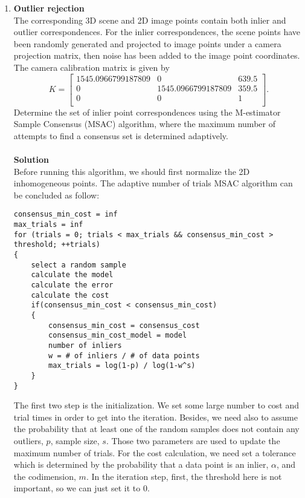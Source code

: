 \documentclass{../../assignment}
\date{\today}
\begin{document}
\begin{problemlist}


\begin{enumerate}
\item \textbf{Outlier rejection}\\
The corresponding 3D scene and 2D image points contain both inlier and outlier correspondences. For the inlier correspondences, the scene points have been randomly generated and projected to image points under a camera projection matrix, then noise has been added to the image point coordinates. The camera calibration matrix is given by
\[K = 
\begin{bmatrix}
1545.0966799187809 & 0 & 639.5\\
0 & 1545.0966799187809 & 359.5\\
0 & 0 & 1\\
\end{bmatrix}.
\]
Determine the set of inlier point correspondences using the M-estimator Sample Consensus (MSAC) algorithm, where the maximum number of attempts to find a consensus set is determined adaptively.\\\\
\textbf{Solution}\\
Before running this algorithm, we should first normalize the 2D inhomogeneous points. The adaptive number of trials MSAC algorithm can be concluded as follow:
\begin{lstlisting}
consensus_min_cost = inf
max_trials = inf
for (trials = 0; trials < max_trials && consensus_min_cost > threshold; ++trials)
{
	select a random sample
	calculate the model
	calculate the error
	calculate the cost
	if(consensus_min_cost < consensus_min_cost)
	{
		consensus_min_cost = consensus_cost
		consensus_min_cost_model = model
		number of inliers
		w = # of inliers / # of data points
		max_trials = log(1-p) / log(1-w^s)
	}
}
\end{lstlisting}
The first two step is the initialization. We set some large number to cost and trial times in order to get into the iteration.
Besides, we need also to assume the probability that at least one of the random samples does not contain any outliers, $p$, sample size, $s$. Those two parameters are used to update the maximum number of trials.
For the cost calculation, we need set a tolerance which is determined by the probability that a data point is an inlier, $\alpha$, and the codimension, $m$.
In the iteration step, first, the threshold here is not important, so we can just set it to 0.


\end{enumerate}
\end{problemlist}
\end{document}
